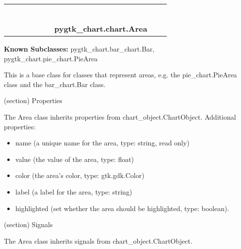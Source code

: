     \label{pygtk_chart:chart:Area}
\begin{tabular}{cccccccccc}
\multicolumn{2}{r}{\settowidth{\BCL}{object}\multirow{2}{\BCL}{object}}
&&
&&
&&
  \\\cline{3-3}
  &&\multicolumn{1}{c|}{}
&&
&&
&&
  \\
\multicolumn{4}{r}{\settowidth{\BCL}{??.GObject}\multirow{2}{\BCL}{??.GObject}}
&&
&&
  \\\cline{5-5}
  &&&&\multicolumn{1}{c|}{}
&&
&&
  \\
\multicolumn{6}{r}{\settowidth{\BCL}{pygtk\_chart.chart\_object.ChartObject}\multirow{2}{\BCL}{pygtk\_chart.chart\_object.ChartObject}}
&&
  \\\cline{7-7}
  &&&&&&\multicolumn{1}{c|}{}
&&
  \\
&&&&&&\multicolumn{2}{l}{\textbf{pygtk\_chart.chart.Area}}
\end{tabular}

\textbf{Known Subclasses:}
pygtk\_chart.bar\_chart.Bar,
    pygtk\_chart.pie\_chart.PieArea

This is a base class for classes that represent areas, e.g. the 
pie\_chart.PieArea class and the bar\_chart.Bar class.

(section) Properties

  The Area class inherits properties from chart\_object.ChartObject. 
  Additional properties:

  \begin{itemize}
  \setlength{\parskip}{0.6ex}
    \item name (a unique name for the area, type: string, read only)

    \item value (the value of the area, type: float)

    \item color (the area's color, type: gtk.gdk.Color)

    \item label (a label for the area, type: string)

    \item highlighted (set whether the area should be highlighted, type: 
      boolean).

  \end{itemize}

(section) Signals

  The Area class inherits signals from chart\_object.ChartObject.


